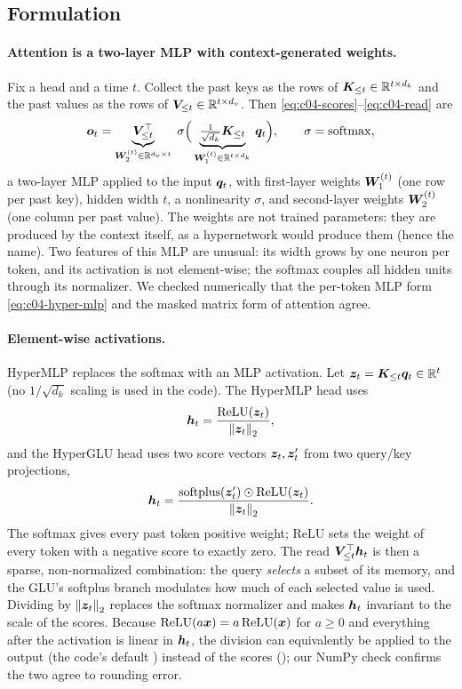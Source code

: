 \subsection{Formulation}

\paragraph{Attention is a two-layer MLP with context-generated weights.}
Fix a head and a time $t$. Collect the past keys as the rows of $\bm{K}_{\le t}\in\mathbb{R}^{t\times d_k}$ and
the past values as the rows of $\bm{V}_{\le t}\in\mathbb{R}^{t\times d_v}$. Then
\eqref{eq:c04-scores}--\eqref{eq:c04-read} are
\begin{equation}\label{eq:c04-hyper-mlp}
  \bm{o}_t=\underbrace{\bm{V}_{\le t}^{\top}}_{\bm{W}_2^{(t)}\in\mathbb{R}^{d_v\times t}}\;
  \sigma\Big(\underbrace{\tfrac{1}{\sqrt{d_k}}\bm{K}_{\le t}}_{\bm{W}_1^{(t)}\in\mathbb{R}^{t\times d_k}}\,\bm{q}_t\Big),
  \qquad \sigma=\operatorname{softmax},
\end{equation}
a two-layer MLP applied to the input $\bm{q}_t$, with first-layer weights $\bm{W}_1^{(t)}$ (one row per
past key), hidden width $t$, a nonlinearity $\sigma$, and second-layer weights $\bm{W}_2^{(t)}$ (one
column per past value). The weights are not trained parameters: they are produced by the context
itself, as a hypernetwork would produce them (hence the name). Two features of this MLP are unusual:
its width grows by one neuron per token, and its activation is not element-wise; the softmax
couples all hidden units through its normalizer. We checked numerically that the per-token MLP form
\eqref{eq:c04-hyper-mlp} and the masked matrix form of attention agree.

\paragraph{Element-wise activations.}
HyperMLP replaces the softmax with an MLP activation. Let $\bm{z}_t=\bm{K}_{\le t}\bm{q}_t\in\mathbb{R}^t$ (no
$1/\sqrt{d_k}$ scaling is used in the code). The HyperMLP head uses
\begin{equation}\label{eq:c04-hyper-relu}
  \bm{h}_t=\frac{\operatorname{ReLU}(\bm{z}_t)}{\left\lVert \bm{z}_t\right\rVert_2},
\end{equation}
and the HyperGLU head uses two score vectors $\bm{z}_t,\bm{z}'_t$ from two query/key projections,
\begin{equation}\label{eq:c04-hyper-glu}
  \bm{h}_t=\frac{\mathrm{softplus}(\bm{z}'_t)\odot\operatorname{ReLU}(\bm{z}_t)}{\left\lVert \bm{z}_t\right\rVert_2}.
\end{equation}
The softmax gives every past token positive weight; ReLU sets the weight of every token with a
negative score to exactly zero. The read $\bm{V}_{\le t}^{\top}\bm{h}_t$ is then a sparse, non-normalized
combination: the query \emph{selects} a subset of its memory, and the GLU's softplus branch
modulates how much of each selected value is used. Dividing by $\left\lVert \bm{z}_t\right\rVert_2$ replaces the
softmax normalizer and makes $\bm{h}_t$ invariant to the scale of the scores. Because
$\operatorname{ReLU}(a\bm{x})=a\operatorname{ReLU}(\bm{x})$ for $a\ge0$ and everything after the activation is linear in $\bm{h}_t$, the
division can equivalently be applied to the output (the code's default ) instead
of the scores (); our NumPy check confirms the two agree to rounding error.

